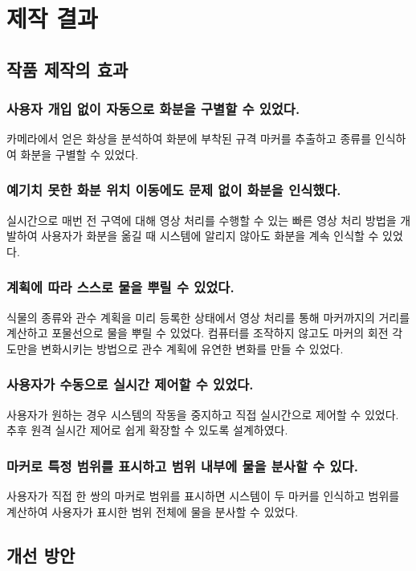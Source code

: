\documentclass[chapter,11pt,oneside,openany]{xoblivoir}
\begin{document}
\chapter{제작 결과}

\section{작품 제작의 효과}

\subsection{사용자 개입 없이 자동으로 화분을 구별할 수 있었다.}
카메라에서 얻은 화상을 분석하여 화분에 부착된 규격 마커를 추출하고 종류를 인식하여
화분을 구별할 수 있었다.

\subsection{예기치 못한 화분 위치 이동에도 문제 없이 화분을 인식했다.}
실시간으로 매번 전 구역에 대해 영상 처리를 수행할 수 있는 빠른 영상 처리 방법을 개발하여
사용자가 화분을 옮길 때 시스템에 알리지 않아도 화분을 계속 인식할 수 있었다.

\subsection{계획에 따라 스스로 물을 뿌릴 수 있었다.}
식물의 종류와 관수 계획을 미리 등록한 상태에서 영상 처리를 통해
마커까지의 거리를 계산하고 포물선으로 물을 뿌릴 수 있었다.
컴퓨터를 조작하지 않고도 마커의 회전 각도만을 변화시키는 방법으로 관수 계획에 유연한 변화를 만들 수 있었다.

\subsection{사용자가 수동으로 실시간 제어할 수 있었다.}
사용자가 원하는 경우 시스템의 작동을 중지하고 직접 실시간으로 제어할 수 있었다.
추후 원격 실시간 제어로 쉽게 확장할 수 있도록 설계하였다.

\subsection{마커로 특정 범위를 표시하고 범위 내부에 물을 분사할 수 있다.}
사용자가 직접 한 쌍의 마커로 범위를 표시하면 시스템이 두 마커를 인식하고 범위를 계산하여
사용자가 표시한 범위 전체에 물을 분사할 수 있었다.

\section{개선 방안}
\end{document}

